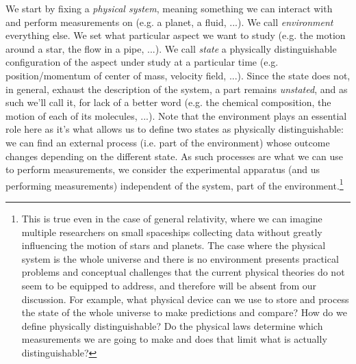 \documentclass[aps,pra,10pt,twocolumn,floatfix,nofootinbib]{revtex4-1}
\numberwithin{equation}{section}
\theoremstyle{definition}
\begin{document}
We start by fixing a \emph{physical system}, meaning something we can interact with and perform measurements on (e.g. a planet, a fluid, ...). We call \emph{environment} everything else. We set what particular aspect we want to study (e.g. the motion around a star, the flow in a pipe, ...). We call \emph{state} a physically distinguishable configuration of the aspect under study at a particular time (e.g. position/momentum of center of mass, velocity field, ...). Since the state does not, in general, exhaust the description of the system, a part remains \emph{unstated}, and as such we'll call it, for lack of a better word (e.g. the chemical composition, the motion of each of its molecules, ...). Note that the environment plays an essential role here as it's what allows us to define two states as physically distinguishable: we can find an external process (i.e. part of the environment) whose outcome changes depending on the different state. As such processes are what we can use to perform measurements, we consider the experimental apparatus (and us performing measurements) independent of the system, part of the environment.\footnote{This is true even in the case of general relativity, where we can imagine multiple researchers on small spaceships collecting data without greatly influencing the motion of stars and planets. The case where the physical system is the whole universe and there is no environment presents practical problems  and conceptual challenges that the current physical theories do not seem to be equipped to address, and therefore will be absent from our discussion. For example, what physical device can we use to store and process the state of the whole universe to make predictions and compare? How do we define physically distinguishable? Do the physical laws determine which measurements we are going to make and does that limit what is actually distinguishable?}
 
\end{document}
